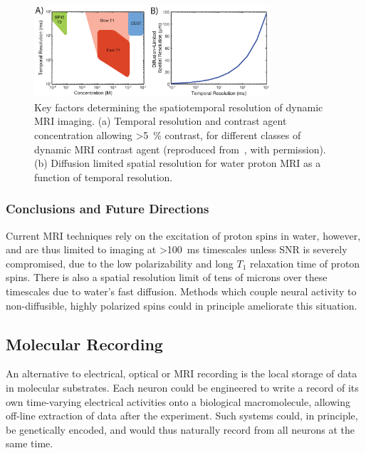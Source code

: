 \begin{figure}[htbp]
\caption{Key factors determining the spatiotemporal resolution of dynamic MRI imaging. (a) Temporal resolution and contrast agent concentration allowing \SI{>5}{\percent} contrast, for different classes of dynamic MRI contrast agent (reproduced from~\cite{shapiro06}, with permission). (b) Diffusion limited spatial resolution for water proton MRI as a function of temporal resolution.}
\label{fig:mriresolution}
\centering
\includegraphics[width=0.78\textwidth]{figs/Fig6.eps}
\end{figure}

\subsubsection{Conclusions and Future Directions}

Current MRI techniques rely on the excitation of proton spins in water, however, and are thus limited to imaging at \SI{>100}{\ms} timescales unless SNR is severely compromised, due to the low polarizability and long $T_1$ relaxation time of proton spins.
There is also a spatial resolution limit of tens of microns over these timescales due to water's fast diffusion. Methods which couple neural activity to non-diffusible, highly polarized spins could in principle ameliorate this situation.

\subsection{Molecular Recording}

An alternative to electrical, optical or MRI recording is the local storage of data in molecular substrates.
Each neuron could be engineered to write a record of its own time-varying electrical activities onto a biological macromolecule, allowing off-line extraction of data after the experiment.
Such systems could, in principle, be genetically encoded, and would thus naturally record from all neurons at the same time.


